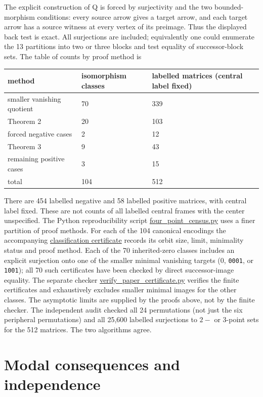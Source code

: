 \documentclass[11pt]{article}
\begin{document}
The explicit construction of Q is forced by surjectivity and the two bounded-morphism conditions: every source arrow gives a target arrow, and each target arrow has a source witness at every vertex of its preimage. Thus the displayed back test is exact. All surjections are included; equivalently one could enumerate the 13 partitions into two or three blocks and test equality of successor-block sets. The table of counts by proof method is

\begin{center}\small
\begin{tabular}{lll}
\toprule
method & isomorphism classes & labelled matrices (central label fixed)\\
\midrule
smaller vanishing quotient & 70 & 339\\
Theorem 2 & 20 & 103\\
forced negative cases & 2 & 12\\
Theorem 3 & 9 & 43\\
remaining positive cases & 3 & 15\\
total & 104 & 512\\
\bottomrule
\end{tabular}
\end{center}

There are 454 labelled negative and 58 labelled positive matrices, with central label fixed. These are not counts of all labelled central frames with the center unspecified. The Python reproducibility script \href{../experiments/four\_point\_census.py}{four\_point\_census.py} uses a finer partition of proof methods. For each of the 104 canonical encodings the accompanying \href{four\_point\_classification.csv}{classification certificate} records its orbit size, limit, minimality status and proof method. Each of the 70 inherited-zero classes includes an explicit surjection onto one of the smaller minimal vanishing targets (0, \texttt{0001}, or \texttt{1001}); all 70 such certificates have been checked by direct successor-image equality. The separate checker \href{../experiments/verify\_paper\_certificate.py}{verify\_paper\_certificate.py} verifies the finite certificates and exhaustively excludes smaller minimal images for the other classes. The asymptotic limits are supplied by the proofs above, not by the finite checker. The independent audit checked all 24 permutations (not just the six peripheral permutations) and all 25,600 labelled surjections to $2-$ or 3-point sets for the 512 matrices. The two algorithms agree.

\section{Modal consequences and independence}
\end{document}

